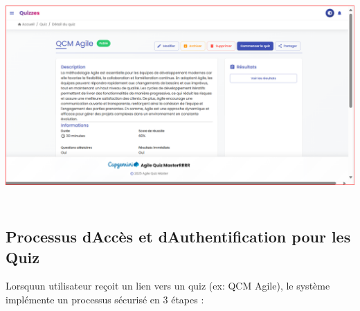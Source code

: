 \documentclass[12pt,a4paper,twoside,openright]{report}
\begin{document}
\includegraphics[width=6.3in,height=3.24097in]{latex_media/media/image60.png}

\hypertarget{processus-daccuxe8s-et-dauthentification-pour-les-quiz}{%
\subsection{Processus d\textquotesingle Accès et
d\textquotesingle Authentification pour les
Quiz}\label{processus-daccuxe8s-et-dauthentification-pour-les-quiz}}

Lorsqu\textquotesingle un utilisateur reçoit un lien vers un quiz (ex:
QCM Agile), le système implémente un processus sécurisé en 3 étapes :
\end{document}
